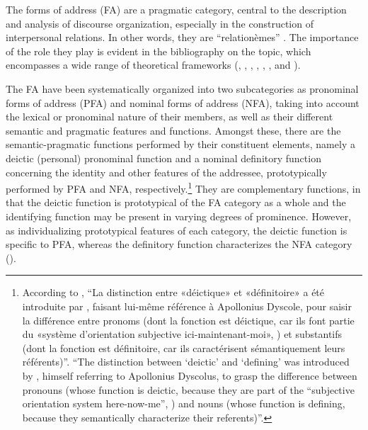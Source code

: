 \documentclass[output=paper]{langscibook}
\begin{document}
The forms of address (FA) are a pragmatic category, central to the description and analysis of discourse organization, especially in the construction of interpersonal relations. In other words, they are “relationèmes” \parencites[37]{Kerbrat-Orecchioni1992}[8]{Kerbrat-Orecchioni2010}.  The importance of the role they play is evident in the bibliography on the topic, which encompasses a wide range of theoretical frameworks (\citealt{Cintra1972}, \citealt{Medeiros1985}, \citealt{Carreira1997,Carreira2004}, \citealt{Hammermüller2004}, \citealt{Duarte2010,Duarte2011}, \citealt{Kerbrat-Orecchioni2010}, and \citealt{ScherreMartins2015}).



The FA have been systematically organized \citep[8]{Kerbrat-Orecchioni2010} into two subcategories as pronominal forms of address (PFA) and nominal forms of address (NFA), taking into account the lexical or pronominal nature of their members, as well as their different semantic and pragmatic features and functions. Amongst these, there are the semantic-pragmatic functions performed by their constituent elements, namely a deictic (personal) pronominal function and a nominal definitory function concerning the identity and other features of the addressee, prototypically performed by PFA and NFA, respectively.\footnote{According to \citet{Johnen2014}, “La distinction entre «déictique» et «définitoire» a été introduite par \citet[114–120]{Bühler1982}, faisant lui-même référence à Apollonius Dyscole, pour saisir la différence entre pronoms (dont la fonction est déictique, car ils font partie du «système d’orientation subjective ici-maintenant-moi», \citealt[149]{Bühler1982}) et substantifs (dont la fonction est définitoire, car ils caractérisent sémantiquement leurs référents)”. “The distinction between ‘deictic' and ‘defining' was introduced by \citet[114–120]{Bühler1982}, himself referring to Apollonius Dyscolus, to grasp the difference between pronouns (whose function is deictic, because they are part of the “subjective orientation system here-now-me”, \citealt[149]{Bühler1982}) and nouns (whose function is defining, because they semantically characterize their referents)”.}  They are complementary functions, in that the deictic function is prototypical of the FA category as a whole and the identifying function may be present in varying degrees of prominence. However, as individualizing prototypical features of each category, the deictic function is specific to PFA, whereas the definitory function characterizes the NFA category (\citealt{Carreira1997,Carreira2004,Carreira2007,Kerbrat-Orecchioni2014}).
\end{document}
